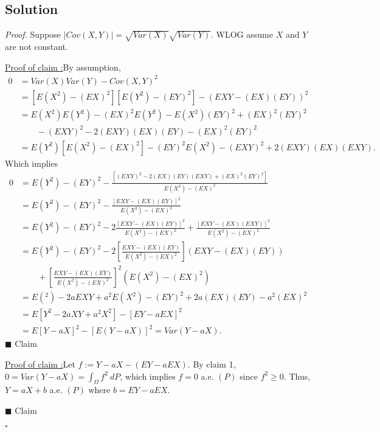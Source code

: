 \documentclass[12pt]{article}
\newcounter{ProofCounter}
\newcounter{ClaimCounter}[ProofCounter]
\newenvironment{Proof}{\stepcounter{ProofCounter}\textit{Proof.}}{\hfill$\square$}
\newenvironment{claim}[1]{\vspace{3mm}\stepcounter{ClaimCounter}\par\noindent\underline{\bf Claim \theClaimCounter:}\space#1}{}
\newenvironment{claimproof}[1]{\par\noindent\underline{Proof of claim \theClaimCounter:}\space#1}{\hfill $\blacksquare$ Claim \theClaimCounter}
\begin{document}
\subsection*{Solution}
\begin{Proof}
Suppose $|Cov(X,Y)| = \sqrt{Var(X)}\sqrt{Var(Y)}$. WLOG assume $X$ and $Y$ are not constant.

\begin{claimproof}
By assumption,
\begin{align*}
0 & = Var(X)Var(Y) - Cov(X,Y)^{2} \\
& = [E(X^{2}) - (EX)^{2}][E(Y^{2}) - (EY)^{2}] - (EXY - (EX)(EY))^{2} \\
& = E(X^{2})E(Y^{2}) - (EX)^{2}E(Y^{2}) - E(X^{2})(EY)^{2} + (EX)^{2}(EY)^{2} \\ 
& \qquad - (EXY)^{2} - 2(EXY)(EX)(EY) - (EX)^{2}(EY)^{2} \\
& = E(Y^{2})[E(X^{2}) - (EX)^{2}] - (EY)^{2}E(X^{2}) - (EXY)^{2}+ 2(EXY)(EX)(EXY).
\end{align*}
Which implies
\begin{align*}
0 & = E(Y^{2}) - (EY)^{2} - \frac{[(EXY)^{2} - 2(EX)(EY)(EXY) + (EX)^{2}(EY)^{2}]}{E(X^{2}) - (EX)^{2}} \\
& = E(Y^{2}) - (EY)^{2} - \frac{[EXY - (EX)(EY)]^{2}}{E(X^{2}) - (EX)^{2}} \\
& = E(Y^{2}) - (EY)^{2} - 2\frac{[EXY - (EX)(EY)]^{2}}{E(X^{2}) - (EX)^{2}} + \frac{[EXY - (EX)(EXY)]^{2}}{E(X^{2}) - (EX)^{2}} \\
& = E(Y^{2}) - (EY)^{2} - 2\left[ \frac{EXY - (EX)(EY)}{E(X^{2}) - (EX)^{2}} \right](EXY - (EX)(EY)) \\
& \qquad + \left[ \frac{EXY - (EX)(EY)}{E(X^{2}) -
(EX)^{2}} \right]^{2}(E(X^{2}) - (EX)^{2}) \\
& = E(^{2}) - 2aEXY + a^{2}E(X^{2}) - (EY)^{2} + 2a(EX)(EY) - a^{2}(EX)^{2} \\
& = E[Y^{2} - 2aXY + a^{2}X^{2}] - [EY - aEX]^{2} \\
& = E[Y - aX]^{2} - [E(Y - aX)]^{2} = Var(Y - aX).
\end{align*}
\end{claimproof}

\begin{claimproof}
Let $f := Y - aX - (EY - aEX)$. By claim 1, $0 = Var(Y - aX) = \int_{\Omega}f^{2}\ dP$,
which implies $f = 0$ a.e. $(P)$ since $f^{2} \geq 0$.  Thus, $Y = aX + b$ a.e. $(P)$ where $b = EY - aEX$. 

\end{claimproof}

\end{Proof}
\end{document}
